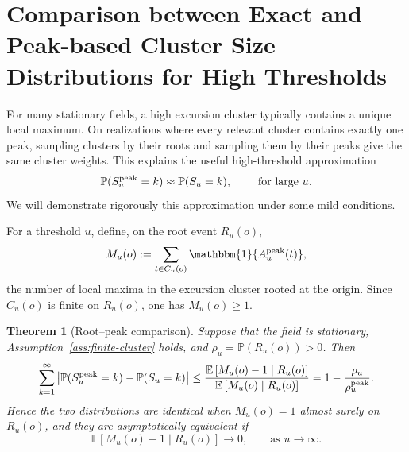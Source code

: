 \documentclass[aap,preprint]{imsart}
\theoremstyle{plain}
\newtheorem{theorem}{Theorem}[section]
\theoremstyle{definition}
\def\E{{\mathbb E}}
\def\P{{\mathbb P}}
\begin{document}
\section{Comparison between Exact and Peak-based Cluster Size Distributions for High Thresholds}\label{sec:high-u}

For many stationary fields, a high excursion cluster typically
contains a unique local maximum.  On realizations where every relevant
cluster contains exactly one peak, sampling clusters by their roots and
sampling them by their peaks give the same cluster weights.  This explains
the useful high-threshold approximation
\[
\P(S_u^{\rm peak}=k)\approx\P(S_u=k), \qquad \text{ for large $u$}.
\]
We will demonstrate rigorously this approximation under some mild conditions.

For a threshold $u$, define, on the root event $R_u(o)$,
\begin{equation}\label{eq:number-peaks-root-cluster}
	M_u(o)
	:=
	\sum_{t\in C_u(o)}
	\mathbbm{1}\{A_u^{\rm peak}(t)\},
\end{equation}
the number of local maxima in the excursion cluster rooted at the
origin. Since $C_u(o)$ is finite on $R_u(o)$, one has $M_u(o)\geq1$. 

\begin{theorem}[Root--peak comparison]
	\label{thm:root-peak-comparison}
	Suppose that the field is stationary, Assumption~\ref{ass:finite-cluster}
	holds, and $\rho_u=\P(R_u(o))>0$. Then
	\begin{equation}\label{eq:root-peak-TV-bound}
		\sum_{k=1}^{\infty} \left|
		\P(S_u^{\rm peak}=k)
		-\P(S_u=k)
		\right|
		\leq
		\frac{\E\left[M_u(o)-1\mid R_u(o)\right]}
		{\E\left[M_u(o)\mid R_u(o)\right]}
		=
		1-\frac{\rho_u}{\rho_u^{\rm peak}}.
	\end{equation}
	Hence the two distributions are identical when $M_u(o)=1$ almost surely on
	$R_u(o)$, and they are asymptotically equivalent if
	\[
	\E\left[M_u(o)-1\mid R_u(o)\right]\to 0,
	\qquad\text{as }u\to\infty.
	\]
\end{theorem}
\end{document}
